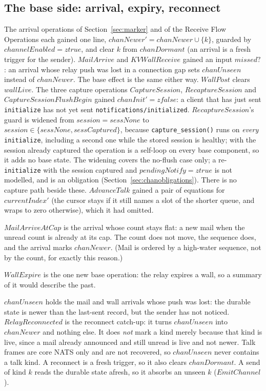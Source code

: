 \documentclass[a4paper,10pt,fleqn]{article}
\begin{document}
\subsection{The base side: arrival, expiry, reconnect}

The arrival operations of Section~\ref{sec:marker} and of the
Receive Flow Operations each gained one line, $chanNewer' = chanNewer \cup
\{ k \}$, guarded by $channelEnabled = ztrue$, and clear $k$ from
$chanDormant$ (an arrival is a fresh trigger for the sender).  $MailArrive$
and $KVWallReceive$ gained an input $missed?$: an arrival whose relay push
was lost in a connection gap sets $chanUnseen$ instead of $chanNewer$.  The
base effect is the same either way.  $WallPost$ clears $wallLive$.  The
three capture operations $CaptureSession$, $RecaptureSession$ and
$CaptureSessionFlushBegin$ gained $chanInit' = zfalse$: a client that has
just sent \texttt{initialize} has not yet sent
\texttt{notifications/initialized}.  $RecaptureSession$'s guard is widened
from $session = sessNone$ to $session \in \{ sessNone, sessCaptured \}$,
because \texttt{capture\_session()} runs on \emph{every} \texttt{initialize},
including a second one while the stored session is healthy; with the session
already captured the operation is a self-loop on every base component, so it
adds no base state.  The widening covers the no-flush case only; a
re-\texttt{initialize} with the session captured and $pendingNotify = ztrue$
is not modelled, and is an obligation (Section~\ref{sec:chanobligations}).
There is no capture path beside these.  $AdvanceTalk$ gained a pair of
equations for $currentIndex'$ (the cursor stays if it still names a slot of
the shorter queue, and wraps to zero otherwise), which it had omitted.

$MailArriveAtCap$ is the arrival whose count stays flat: a new mail when the
unread count is already at its cap.  The count does not move, the sequence
does, and the arrival marks $chanNewer$.  (Mail is ordered by a high-water
sequence, not by the count, for exactly this reason.)

$WallExpire$ is the one new base operation: the relay expires a wall, so a
summary of it would describe the past.

$chanUnseen$ holds the mail and wall arrivals whose push was lost: the
durable state is newer than the last-sent record, but the sender has not
noticed.  $RelayReconnected$ is the reconnect catch-up: it turns
$chanUnseen$ into $chanNewer$ and nothing else.  It does \emph{not} mark a
kind merely because that kind is live, since a mail already announced and
still unread is live and not newer.  Talk frames are core NATS only and are
not recovered, so $chanUnseen$ never contains a talk kind.  A reconnect is a
fresh trigger, so it also clears $chanDormant$.  A send of kind $k$ reads the
durable state afresh, so it absorbs an unseen $k$ ($EmitChannel$).
\end{document}
